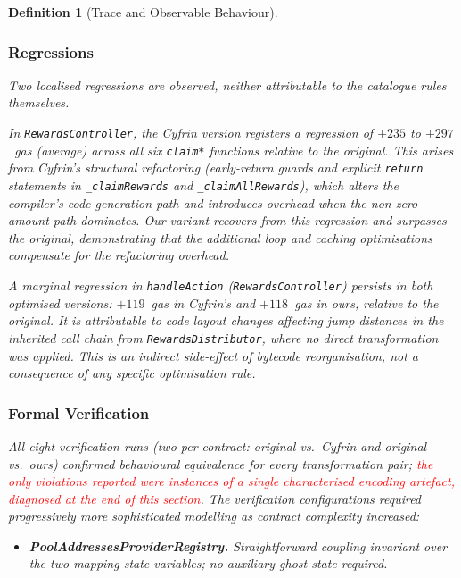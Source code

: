 \documentclass[manuscript,screen,review]{acmart}
\newcommand{\revised}[1]{\textcolor{red}{#1}}
\newtheorem{definition}{Definition}
\begin{document}
\begin{definition}[Trace and Observable Behaviour]
\subsubsection{Regressions}
\label{sssec:regressions}

Two localised regressions are observed, neither attributable to the catalogue rules themselves.

In \texttt{RewardsController}, the Cyfrin version registers a regression of $+235$ to $+297$~gas (average) across all six \texttt{claim*} functions relative to the original. This arises from Cyfrin's structural refactoring (early-return guards and explicit \texttt{return} statements in \texttt{\_claimRewards} and \texttt{\_claimAllRewards}), which alters the compiler's code generation path and introduces overhead when the non-zero-amount path dominates. Our variant recovers from this regression and surpasses the original, demonstrating that the additional loop and caching optimisations compensate for the refactoring overhead.

A marginal regression in \texttt{handleAction} (\texttt{RewardsController}) persists in both optimised versions: $+119$~gas in Cyfrin's and $+118$~gas in ours, relative to the original. It is attributable to code layout changes affecting jump distances in the inherited call chain from \texttt{RewardsDistributor}, where no direct transformation was applied. This is an indirect side-effect of bytecode reorganisation, not a consequence of any specific optimisation rule.

\subsubsection{Formal Verification}
\label{sssec:formal_verification}

All eight verification runs (two per contract: original vs.\ Cyfrin and
original vs.\ ours) confirmed behavioural equivalence for every transformation
pair; \revised{the only violations reported were instances of a single
characterised encoding artefact, diagnosed at the end of this section}. The
verification configurations required progressively more sophisticated modelling
as contract complexity increased:

\begin{itemize}
  \item \textbf{PoolAddressesProviderRegistry.} Straightforward coupling
    invariant over the two mapping state variables; no auxiliary ghost
    state required.


\end{itemize}
\end{definition}
\end{document}
